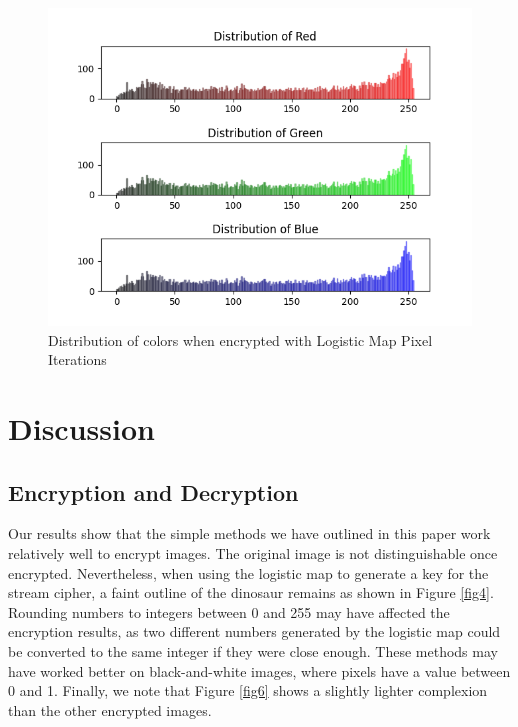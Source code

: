 \documentclass[10pt]{article}
\begin{document}
	
	\begin{figure}[htbp]
		\centering
		\includegraphics[width=0.95\columnwidth]{LMapPixelDinoEncrypted_histogram.png}
		\caption{Distribution of colors when encrypted with Logistic Map Pixel Iterations}
		\label{fig14}
	\end{figure}


	

    
    
    

    
    
    
    
    \section{Discussion}
    
    \subsection{Encryption and Decryption}
    Our results show that the simple methods we have outlined in this paper work relatively well to encrypt images. The original image is not distinguishable once encrypted. Nevertheless, when using the logistic map to generate a key for the stream cipher, a faint outline of the dinosaur remains as shown in Figure \ref{fig4}. Rounding numbers to integers between 0 and 255 may have affected the encryption results, as two different numbers generated by the logistic map could be converted to the same integer if they were close enough. These methods may have worked better on black-and-white images, where pixels have a value between 0 and 1. Finally, we note that Figure \ref{fig6} shows a slightly lighter complexion than the other encrypted images.
    
\end{document}
